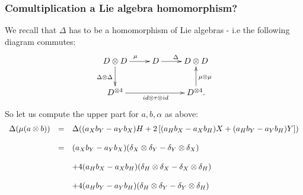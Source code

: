 \subsubsection{Comultiplication a Lie algebra homomorphism?}
We recall that $\Delta$ has to be a homomorphism of Lie algebras - i.e the following diagram commutes:
$$\xymatrix{
D \otimes D \ar[d]_{\Delta \otimes \Delta}\ar[r]^{\mu} &D \ar[r]^\Delta & D \otimes D\\
D^{\otimes 4}\ar[rr]_{id \otimes \tau \otimes id} && D^{\otimes 4}\ar[u]_{\mu \otimes \mu}.\\
}$$
So let us compute the upper part for $a, b, \alpha$ as above:
$$\bao{rcl}
\Delta(\mu(a \otimes b)) &=& \Delta((a_X b_Y - a_Y b_X) H + 2\left[(a_H b_X - a_X b_H) X + (a_H b_Y - a_Y b_H) Y\right])\\
&&\\
&=& (a_X b_Y - a_Y b_X) (\delta_X \otimes \delta_Y - \delta_Y \otimes \delta_X)\\
&&\\
&& + 4 (a_H b_X - a_X b_H) (\delta_H \otimes \delta_X - \delta_X \otimes \delta_H)\\
&&\\
&& + 4 (a_H b_Y - a_Y b_H) (\delta_H \otimes \delta_Y - \delta_Y \otimes \delta_H)\\
\ea$$
